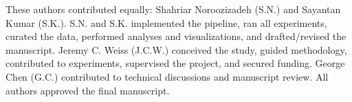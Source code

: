 
These authors contributed equally: Shahriar Noroozizadeh (S.N.) and Sayantan Kumar (S.K.).
S.N. and S.K. implemented the pipeline, ran all experiments, curated the data, performed analyses and visualizations, and drafted/revised the manuscript.
Jeremy C. Weiss (J.C.W.) conceived the study, guided methodology, contributed to experiments, supervised the project, and secured funding.
George Chen (G.C.) contributed to technical discussions and manuscript review.
All authors approved the final manuscript.

